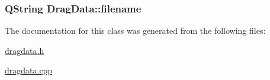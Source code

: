 \subsubsection[{\texorpdfstring{filename}{filename}}]{\setlength{\rightskip}{0pt plus 5cm}Q\+String Drag\+Data\+::filename\hspace{0.3cm}{\ttfamily [private]}}\hypertarget{classDragData_a3ec29e3d1a3a05e44582a724244256f5}{}\label{classDragData_a3ec29e3d1a3a05e44582a724244256f5}


The documentation for this class was generated from the following files\+:\begin{DoxyCompactItemize}
\item 
\hyperlink{dragdata_8h}{dragdata.\+h}\item 
\hyperlink{dragdata_8cpp}{dragdata.\+cpp}\end{DoxyCompactItemize}
